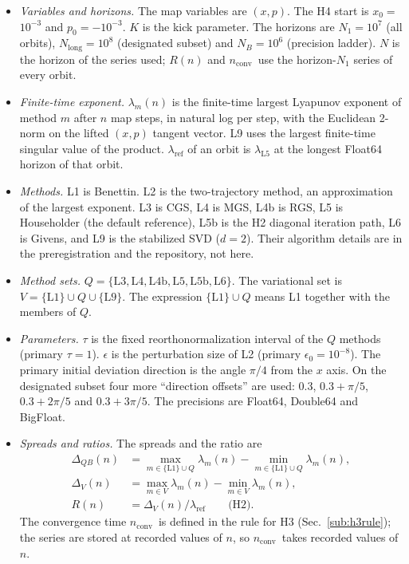 \documentclass[aip,cha,reprint,amsmath,amssymb,longbibliography]{revtex4-2}
\newcommand{\tenp}[1]{\ensuremath{10^{#1}}}
\newcommand{\lam}[1]{\ensuremath{\lambda_{\mathrm{#1}}}}
\newcommand{\lref}{\ensuremath{\lambda_{\mathrm{ref}}}}
\newcommand{\nconv}{\ensuremath{n_{\mathrm{conv}}}}
\newcommand{\Sec}[1]{Sec.~\ref{#1}}
\begin{document}
\begin{itemize}
\item \emph{Variables and horizons.}
The map variables are $(x,p)$.
The H4 start is $x_0=$\tenp{-3} and $p_0=-$\tenp{-3}.
$K$ is the kick parameter.
The horizons are $N_1=$\tenp{7} (all orbits), $N_{\mathrm{long}}=$\tenp{8} (designated subset) and $N_B=$\tenp{6} (precision ladder).
$N$ is the horizon of the series used; $R(n)$ and \nconv\ use the horizon-$N_1$ series of every orbit.

\item \emph{Finite-time exponent.}
$\lambda_m(n)$ is the finite-time largest Lyapunov exponent of method $m$ after $n$ map steps, in natural log per step, with the Euclidean 2-norm on the lifted $(x,p)$ tangent vector.
L9 uses the largest finite-time singular value of the product.
$\lref$ of an orbit is $\lam{L5}$ at the longest Float64 horizon of that orbit.

\item \emph{Methods.}
L1 is Benettin.
L2 is the two-trajectory method, an approximation of the largest exponent.
L3 is CGS, L4 is MGS, L4b is RGS, L5 is Householder (the default reference), L5b is the H2 diagonal iteration path, L6 is Givens, and L9 is the stabilized SVD ($d=2$).
Their algorithm details are in the preregistration and the repository, not here.

\item \emph{Method sets.}
$Q=\{\mathrm{L3},\mathrm{L4},\mathrm{L4b},\mathrm{L5},\mathrm{L5b},\mathrm{L6}\}$.
The variational set is $V=\{\mathrm{L1}\}\cup Q\cup\{\mathrm{L9}\}$.
The expression $\{\mathrm{L1}\}\cup Q$ means L1 together with the members of $Q$.

\item \emph{Parameters.}
$\tau$ is the fixed reorthonormalization interval of the $Q$ methods (primary $\tau=1$).
$\epsilon$ is the perturbation size of L2 (primary $\epsilon_0=$\tenp{-8}).
The primary initial deviation direction is the angle $\pi/4$ from the $x$ axis.
On the designated subset four more ``direction offsets'' are used: 0.3, $0.3+\pi/5$, $0.3+2\pi/5$ and $0.3+3\pi/5$.
The precisions are Float64, Double64 and BigFloat.

\item \emph{Spreads and ratios.}
The spreads and the ratio are
\begin{align}
\Delta_{QB}(n) &= \max_{m\in\{\mathrm{L1}\}\cup Q}\lambda_m(n)-\min_{m\in\{\mathrm{L1}\}\cup Q}\lambda_m(n),\\
\Delta_V(n) &= \max_{m\in V}\lambda_m(n)-\min_{m\in V}\lambda_m(n),\\
R(n) &= \Delta_V(n)/\lref \qquad \text{(H2)}.
\end{align}
The convergence time \nconv\ is defined in the rule for H3 (\Sec{sub:h3rule}); the series are stored at recorded values of $n$, so \nconv\ takes recorded values of $n$.


\end{itemize}
\end{document}
